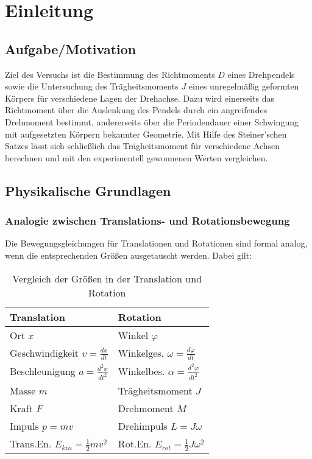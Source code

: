 \chapter{Einleitung}

\section{Aufgabe/Motivation}
Ziel des Versuchs ist die Bestimmung des Richtmoments $D$ eines Drehpendels sowie die Untersuchung des Trägheitsmoments $J$ eines unregelmäßig geformten Körpers für verschiedene Lagen der Drehachse. Dazu wird einerseits das Richtmoment über die Auslenkung des Pendels durch ein angreifendes Drehmoment bestimmt, andererseits über die Periodendauer einer Schwingung mit aufgesetzten Körpern bekannter Geometrie. Mit Hilfe des Steiner’schen Satzes lässt sich schließlich das Trägheitsmoment für verschiedene Achsen berechnen und mit den experimentell gewonnenen Werten vergleichen.

\section{Physikalische Grundlagen}
\subsection*{Analogie zwischen Translations- und Rotationsbewegung}
Die Bewegungsgleichungen für Translationen und Rotationen sind formal analog, wenn die entsprechenden Größen ausgetauscht werden. Dabei gilt:

\begin{table}[h!]
\renewcommand{\arraystretch}{1.75} %
\centering
\begin{tabular}{l|l}
    \textbf{Translation} & \textbf{Rotation} \\
    \hline
    Ort $x$ & Winkel $\varphi$ \\
    Geschwindigkeit $v = \tfrac{dx}{dt}$ & Winkelges. $\omega = \tfrac{d\varphi}{dt}$ \\
    Beschleunigung $a = \tfrac{d^2x}{dt^2}$ & Winkelbes. $\alpha = \tfrac{d^2\varphi}{dt^2}$ \\
    Masse $m$ & Trägheitsmoment $J$ \\
    Kraft $F$ & Drehmoment $M$ \\
    Impuls $p = mv$ & Drehimpuls $L = J\omega$ \\
    Trans.En. $E_{kin} = \tfrac{1}{2}mv^2$ & Rot.En. $E_{rot} = \tfrac{1}{2}J\omega^2$ \\
\end{tabular}
\caption{Vergleich der Größen in der Translation und Rotation}
\label{tab:translation-rotation}
\end{table}

